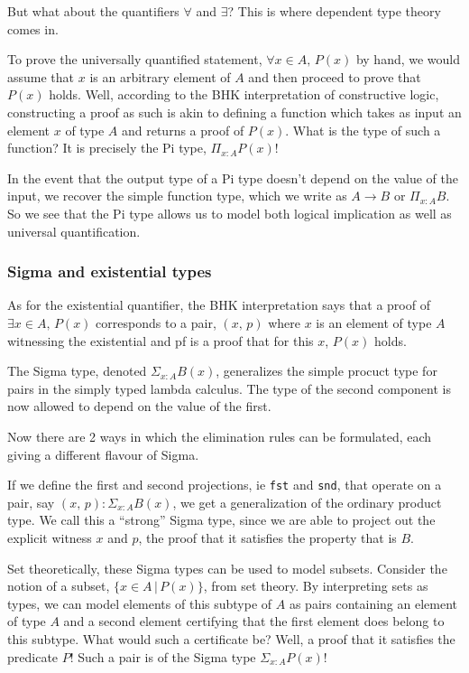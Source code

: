 \documentclass{article}
\begin{document}
But what about the quantifiers $\forall$ and $\exists$?
This is where dependent type theory comes in.

To prove the universally quantified statement, $\forall x \in A, \, P(x)$ by hand,
we would assume that $x$ is an arbitrary element of $A$ and then proceed to prove
that $P(x)$ holds.
Well, according to the BHK interpretation of constructive logic, constructing
a proof as such is akin to defining a function which takes 
as input an element $x$ of type $A$ and returns a proof of $P(x)$.
What is the type of such a function? It is precisely the Pi type, 
$\Pi_{x : A} P(x)$!

In the event that the output type of a Pi type doesn't depend on the value of the
input, we recover the simple function type, which we write as $A \rightarrow B$
or $\Pi_{x : A} B$. So we see that the Pi type allows us to model both
logical implication as well as universal quantification. 

\subsubsection{Sigma and existential types}

As for the existential quantifier, the BHK interpretation says that a 
proof of $\exists x \in A, \, P(x)$ corresponds to a pair, 
$(x, \, p)$ where $x$ is an element
of type $A$ witnessing the existential and pf is a proof that for this $x$, 
$P(x)$ holds.

The Sigma type, denoted $\Sigma_{x : A}B(x)$, generalizes the simple procuct 
type for pairs in the simply typed lambda calculus. 
The type of the second component is now allowed to depend on the
value of the first.

Now there are 2 ways in which the elimination rules can be formulated, each
giving a different flavour of Sigma.

If we define the first and second projections, ie \verb|fst| and \verb|snd|,
that operate on a pair, say $(x, \, p) : \Sigma_{x : A} B(x)$, we get a
generalization of the ordinary product type. We call this a ``strong'' Sigma type,
since we are able to project out the explicit witness $x$ and $p$, the proof
that it satisfies the property that is $B$. 

Set theoretically, these Sigma types can be used to model subsets.
Consider the notion of a subset, $\{x \in A \, | \, P(x) \}$, from set theory.
By interpreting sets as types, we can model elements of this subtype of $A$ as
pairs containing an element of type $A$ and a second element certifying that the
first element does belong to this subtype. What would such a certificate be?
Well, a proof that it satisfies the predicate $P$!
Such a pair is of the Sigma type $\Sigma_{x : A} P(x)$!
\end{document}
